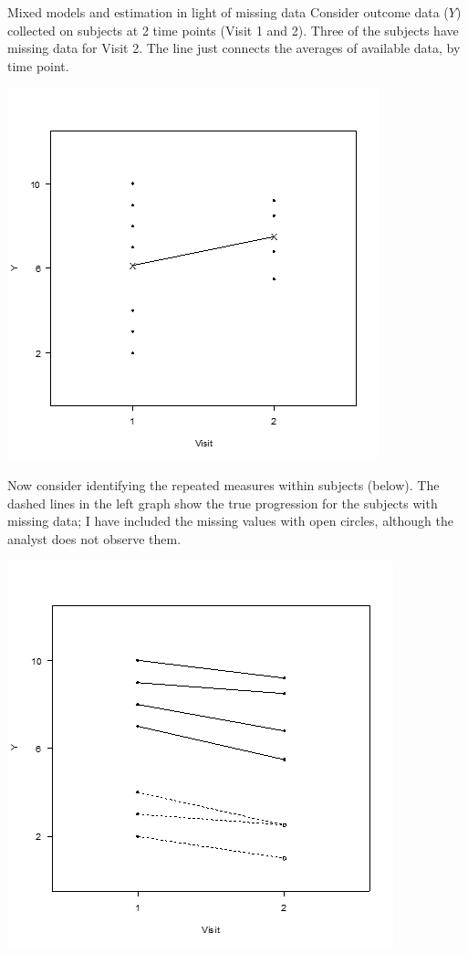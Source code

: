 \documentclass[
  9pt,
  ignorenonframetext,
]{beamer}
\begin{document}
\begin{frame}{Mixed models and estimation in light of missing data}
\protect\hypertarget{mixed-models-and-estimation-in-light-of-missing-data}{}
Consider outcome data (\(Y\)) collected on subjects at 2 time points
(Visit 1 and 2). Three of the subjects have missing data for Visit 2.
The line just connects the averages of available data, by time point.

\begin{center}\includegraphics[width=0.7\linewidth]{figs_L20/f1} \end{center}
\end{frame}

\begin{frame}{}
\protect\hypertarget{section}{}
Now consider identifying the repeated measures within subjects (below).
The dashed lines in the left graph show the true progression for the
subjects with missing data; I have included the missing values with open
circles, although the analyst does not observe them.

\begin{center}\includegraphics[width=0.7\linewidth]{figs_L20/f2} \end{center}
\end{frame}
\end{document}
